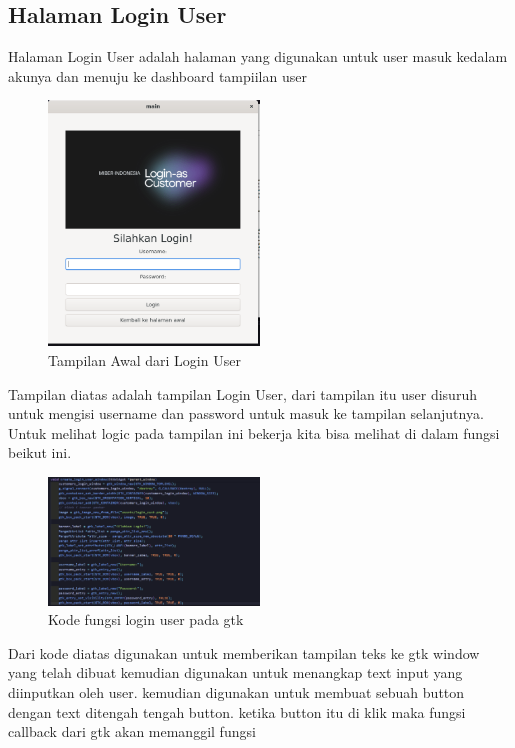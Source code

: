\documentclass[a4paper,12pt]{article}
\begin{document}
\subsection{Halaman Login User}
Halaman Login User adalah halaman yang digunakan untuk user masuk kedalam akunya dan menuju ke dashboard tampiilan user
\begin{figure}[!htbp]
    \centering
    \includegraphics[width=0.5\textwidth]{./img/login_user.png}
    \caption{Tampilan Awal dari Login User}
\end{figure}
\FloatBarrier
Tampilan diatas adalah tampilan Login User, dari tampilan itu user disuruh untuk mengisi username dan password untuk masuk ke tampilan selanjutnya. Untuk melihat
logic pada tampilan ini bekerja kita bisa melihat di dalam fungsi beikut ini.
\begin{figure}[!htbp]
    \centering
    \includegraphics[width=0.5\textwidth]{./img/kode_login_user.png}
    \caption{Kode fungsi login user pada gtk}
\end{figure}
\FloatBarrier
Dari kode diatas \texttt{} digunakan untuk memberikan tampilan teks ke gtk window yang telah dibuat
kemudian \texttt{} digunakan untuk menangkap text input yang diinputkan oleh user. kemudian \texttt{}
digunakan untuk membuat sebuah button dengan text ditengah tengah button. ketika button itu di klik maka fungsi callback dari gtk akan memanggil fungsi \texttt{} 
\end{document}
